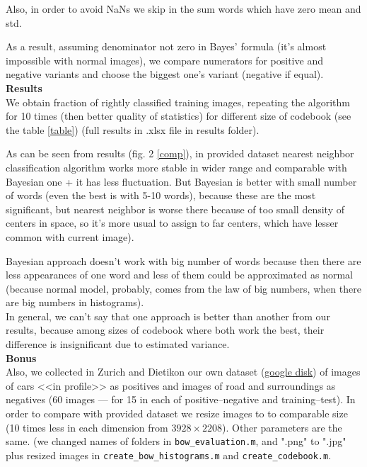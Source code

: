 \documentclass{report}
\begin{document}
	 Also, in order to avoid NaNs we skip in the sum words which have zero mean and std.
	 
	 As a result, assuming denominator not zero in Bayes' formula (it's almost impossible with normal images), we compare numerators for positive and negative variants and choose the biggest one's variant (negative if equal).\\
	 
	 \textbf{Results}\\
	 We obtain fraction of rightly classified training images, repeating the algorithm for 10 times (then better quality of statistics) for different size of codebook (see the table \ref{table}) (full results in .xlsx file in results folder).
	 
	 As can be seen from results (fig. 2 \ref{comp}), in provided dataset nearest neighbor classification algorithm works more stable in wider range and comparable with Bayesian one + it has less fluctuation. But Bayesian is better with small number of words (even the best is with 5-10 words), because these are the most significant, but nearest neighbor is worse there because of too small density of centers in space, so it's more usual to assign to far centers, which have lesser common with current image). 
	 
	 Bayesian approach doesn't work with big number of words because then there are less appearances of one word and less of them could be approximated as normal (because normal model, probably, comes from the law of big numbers, when there are big numbers in histograms).\\
	 
	 In general, we can't say that one approach is better than another from our results, because among sizes of codebook where both work the best, their difference is insignificant due to estimated variance.\\
	 
	 \textbf{Bonus}\\
	 Also, we collected in Zurich and Dietikon our own dataset (\href{https://drive.google.com/drive/folders/1rt7VSSvhPKGTcGuDaD1_le7s5Z9yq1aX?usp=sharing}{google disk}) of images of cars <<in profile>> as positives and images of road and surroundings as negatives (60 images --- for 15 in each of positive--negative and training--test). In order to compare with provided dataset we resize images to  to comparable size (10 times less in each dimension from $3928\times 2208$). Other parameters are the same. (we changed names of folders in \texttt{bow\_evaluation.m}, and ".png" to ".jpg" plus  resized images in \texttt{create\_bow\_histograms.m} and \texttt{create\_codebook.m}.
	 
\end{document}
